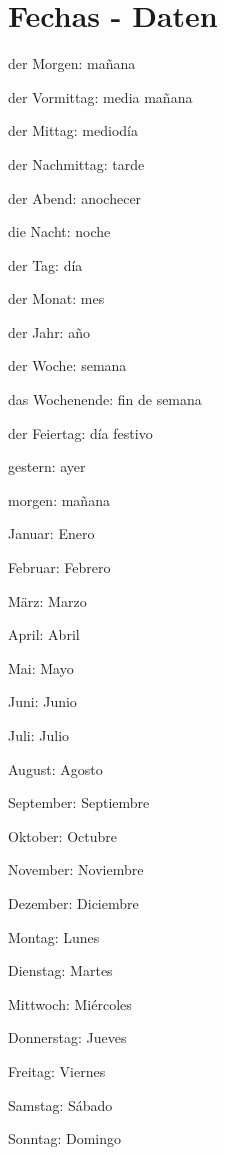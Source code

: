 \section{Fechas - Daten}
\begin{multicols}{2}
\begin{myitemize}
\item der Morgen: mañana
\item der Vormittag: media mañana
\item der Mittag: mediodía
\item der Nachmittag: tarde
\item der Abend: anochecer
\item die Nacht: noche
\item der Tag: día
\item der Monat: mes
\item der Jahr: año
\item der Woche: semana
\item das Wochenende: fin de semana
\item der Feiertag: día festivo
\item gestern: ayer
\item morgen: mañana
\item Januar: Enero
\item Februar: Febrero
\item März: Marzo
\item April: Abril
\item Mai: Mayo
\item Juni: Junio
\item Juli: Julio
\item August: Agosto
\item September: Septiembre
\item Oktober: Octubre
\item November: Noviembre
\item Dezember: Diciembre
\item Montag: Lunes
\item Dienstag: Martes
\item Mittwoch: Miércoles
\item Donnerstag: Jueves
\item Freitag: Viernes
\item Samstag: Sábado
\item Sonntag: Domingo
\end{myitemize}
\end{multicols}

